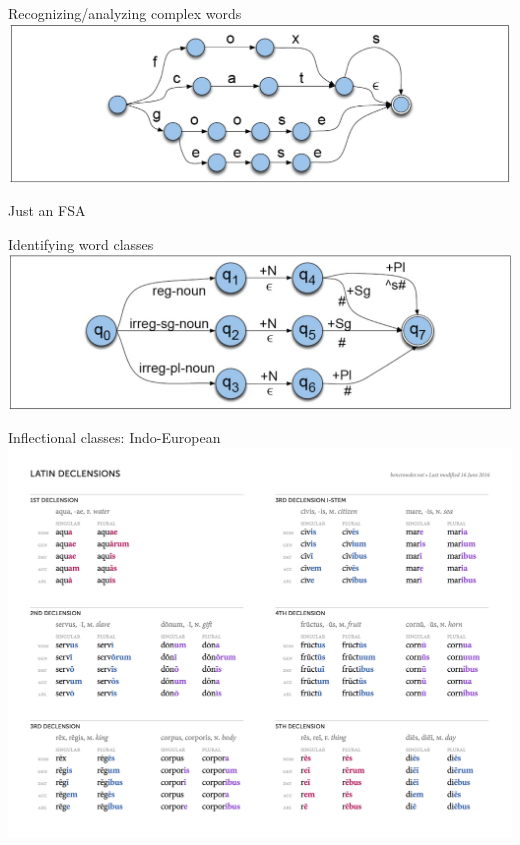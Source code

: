 \documentclass{beamer}
\begin{document}
\begin{frame}{Recognizing/analyzing complex words}
  \includegraphics[width=\textwidth]{figures/3-7}

  Just an FSA
\end{frame}

\begin{frame}{Identifying word classes}
  \includegraphics[width=\textwidth]{figures/3-13}
\end{frame}

\begin{frame}{Inflectional classes: Indo-European}
  \includegraphics[width=\textwidth]{figures/latin-declensions}
\end{frame}
\end{document}

